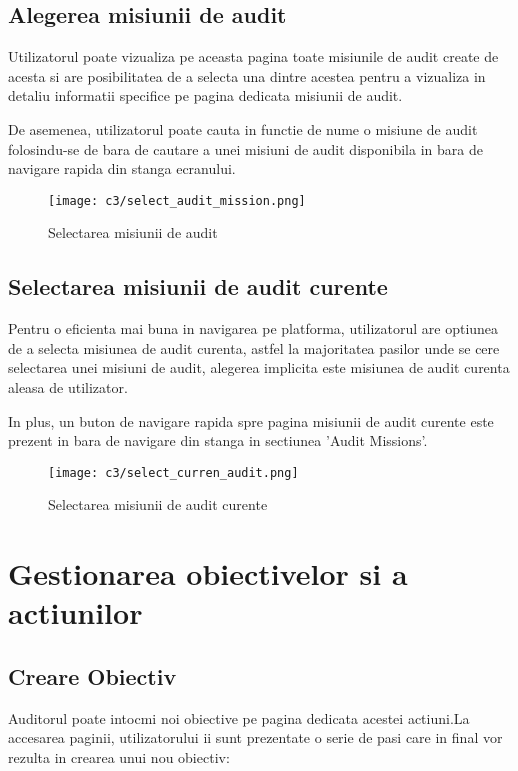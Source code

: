 \subsection*{Alegerea misiunii de audit }
Utilizatorul poate vizualiza pe aceasta pagina toate misiunile de audit create de acesta si are posibilitatea de a selecta una dintre acestea pentru a vizualiza in detaliu informatii specifice pe pagina dedicata misiunii de audit. 

De asemenea, utilizatorul poate cauta in functie de nume o misiune de audit folosindu-se de bara de cautare a unei misiuni de audit disponibila in bara de navigare rapida din stanga ecranului.


\vspace{1cm}
\begin{figure}[h]
	\centering
	
	\texttt{[image: c3/select\_audit\_mission.png]}
	\caption{Selectarea misiunii de audit}
\end{figure}
\newpage
\subsection*{Selectarea misiunii de audit curente}
Pentru o eficienta mai buna in navigarea pe platforma, utilizatorul are optiunea de a selecta misiunea de audit curenta, astfel la majoritatea pasilor unde se cere selectarea unei misiuni de audit, alegerea implicita este misiunea de audit  curenta aleasa de utilizator.

In plus, un buton de navigare rapida spre pagina misiunii de audit curente este prezent in bara de navigare din stanga in sectiunea 'Audit Missions'.


\vspace{1cm}
\begin{figure}[h]
	\centering
	
	\texttt{[image: c3/select\_curren\_audit.png]}
	\caption{Selectarea misiunii de audit curente}
\end{figure}

\section{Gestionarea obiectivelor si a actiunilor}

\subsection*{Creare Obiectiv}
Auditorul poate intocmi noi obiective pe pagina dedicata acestei actiuni.La accesarea paginii, utilizatorului ii sunt prezentate o serie de pasi care in final vor rezulta in crearea unui nou obiectiv:


